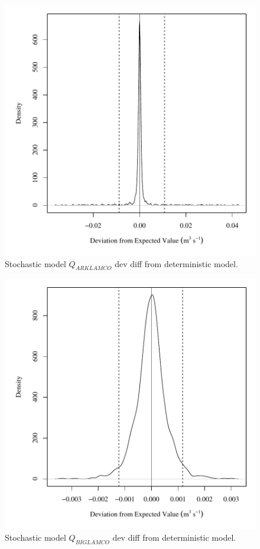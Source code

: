 \begin{center}
\begin{figure}[htbp]
	\includegraphics[width=6in]{"Figures/Results_DSR/V dev diff qin"}
	\caption{Stochastic model $Q_{ARKLAMCO}$ dev diff from deterministic model.}
\end{figure}
\end{center}
\newpage

\begin{center}
\begin{figure}[htbp]
	\includegraphics[width=6in]{"Figures/Results_DSR/V dev diff qBIG"}
	\caption{Stochastic model $Q_{BIGLAMCO}$ dev diff from deterministic model.}
\end{figure}
\end{center}
\newpage

